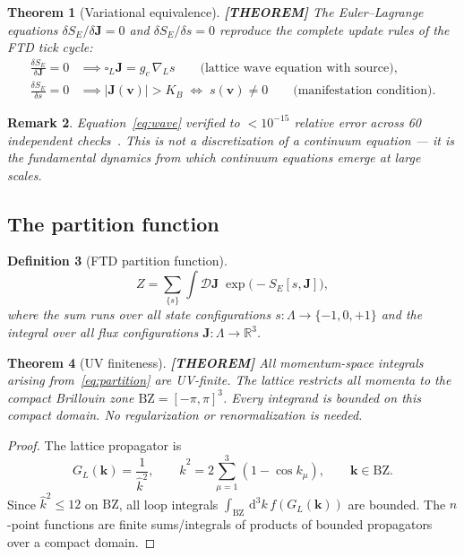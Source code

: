 \documentclass[11pt]{article}
\theoremstyle{tight}
\newtheorem{theorem}{Theorem}[section]
\theoremstyle{plainroman}
\newtheorem{remark}[theorem]{Remark}
\newtheorem{definition}[theorem]{Definition}
\newcommand{\R}{\mathbb{R}}
\newcommand{\dd}{\,\mathrm{d}}
\newcommand{\BZ}{\mathrm{BZ}}
\begin{document}
\begin{theorem}[Variational equivalence]\label{thm:variational}
\textbf{[THEOREM]}
The Euler--Lagrange equations $\delta S_E/\delta\mathbf J=0$ and $\delta S_E/\delta s=0$ reproduce the complete update rules of the FTD tick cycle:
\begin{align}
\frac{\delta S_E}{\delta\mathbf J}=0 &\implies \square_L\mathbf J=g_c\,\nabla_L s \qquad\text{(lattice wave equation with source)},\label{eq:wave}\\
\frac{\delta S_E}{\delta s}=0 &\implies |\mathbf J(\mathbf v)|>K_B \;\Leftrightarrow\; s(\mathbf v)\neq 0 \qquad\text{(manifestation condition)}.\label{eq:manifest}
\end{align}
\end{theorem}

\begin{remark}
Equation~\eqref{eq:wave} verified to $<10^{-15}$ relative error across 60 independent checks~\cite{ftdvar}.
This is not a discretization of a continuum equation --- it is the fundamental dynamics from which continuum equations emerge at large scales.
\end{remark}

\subsection{The partition function}

\begin{definition}[FTD partition function]
\begin{equation}\label{eq:partition}
Z=\sum_{\{s\}}\int\mathcal D\mathbf J\;\exp\!\bigl(-S_E[s,\mathbf J]\bigr),
\end{equation}
where the sum runs over all state configurations $s:\Lambda\to\{-1,0,+1\}$ and the integral over all flux configurations $\mathbf J:\Lambda\to\R^3$.
\end{definition}

\begin{theorem}[UV finiteness]\label{thm:UV}
\textbf{[THEOREM]}
All momentum-space integrals arising from~\eqref{eq:partition} are UV-finite.
The lattice restricts all momenta to the compact Brillouin zone $\BZ=[-\pi,\pi]^3$.
Every integrand is bounded on this compact domain.
No regularization or renormalization is needed.
\end{theorem}
\begin{proof}
The lattice propagator is
\[
G_L(\mathbf k)=\frac{1}{\hat k^2}, \qquad \hat k^2=2\sum_{\mu=1}^3(1-\cos k_\mu), \qquad \mathbf k\in\BZ.
\]
Since $\hat k^2\le 12$ on $\BZ$, all loop integrals $\int_{\BZ}\dd^3 k\,f(G_L(\mathbf k))$ are bounded.
The $n$-point functions are finite sums/integrals of products of bounded propagators over a compact domain.
\end{proof}
\end{document}
